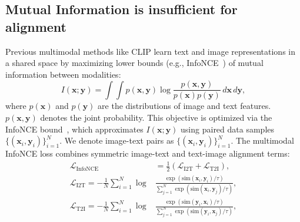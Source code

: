 \subsection{Mutual Information is insufficient for alignment}
Previous multimodal methods like CLIP \cite{radford2021learning} learn text and image representations in a shared space by maximizing lower bounds (e.g., InfoNCE~\citep{oord2018representation}) of mutual information between modalities:
\begin{equation}
\label{eq:mi}
I(\mathbf{x}; \mathbf{y}) = \int \int p(\mathbf{x}, \mathbf{y}) \log \frac{p(\mathbf{x}, \mathbf{y})}{p(\mathbf{x}) p(\mathbf{y})} \, d\mathbf{x} \, d\mathbf{y},
\end{equation}
where \(p(\mathbf{x})\) and \(p(\mathbf{y})\) are the distributions of image and text features. \(p(\mathbf{x}, \mathbf{y})\) denotes the joint probability. This objective is optimized via the InfoNCE bound~\citep{oord2018representation}, which approximates \(I(\mathbf{x}; \mathbf{y})\) using paired data samples \(\{(\mathbf{x}_i, \mathbf{y}_i)\}_{i=1}^N\).  
We denote image-text pairs as \(\{(\mathbf{x}_i, \mathbf{y}_i)\}_{i=1}^{N}\).  
The multimodal InfoNCE loss combines symmetric image-text and text-image alignment terms:
\begin{equation}
\begin{aligned}
\mathcal{L}_{\text{InfoNCE}} &= \frac{1}{2} \left( \mathcal{L}_{\text{I2T}} + \mathcal{L}_{\text{T2I}} \right), \\
\mathcal{L}_{\text{I2T}} = -\frac{1}{N} \sum_{i=1}^N \log & \frac{\exp\left( \text{sim}(\mathbf{x}_i, \mathbf{y}_i)/\tau \right)}{\sum_{j=1}^N \exp\left( \text{sim}(\mathbf{x}_i, \mathbf{y}_j)/\tau \right)}, \\
\mathcal{L}_{\text{T2I}} = -\frac{1}{N} \sum_{i=1}^N \log & \frac{\exp\left( \text{sim}(\mathbf{y}_i, \mathbf{x}_i)/\tau \right)}{\sum_{j=1}^N \exp\left( \text{sim}(\mathbf{y}_i, \mathbf{x}_j)/\tau \right)},
\end{aligned}
\label{eq.infonce}
\end{equation}
